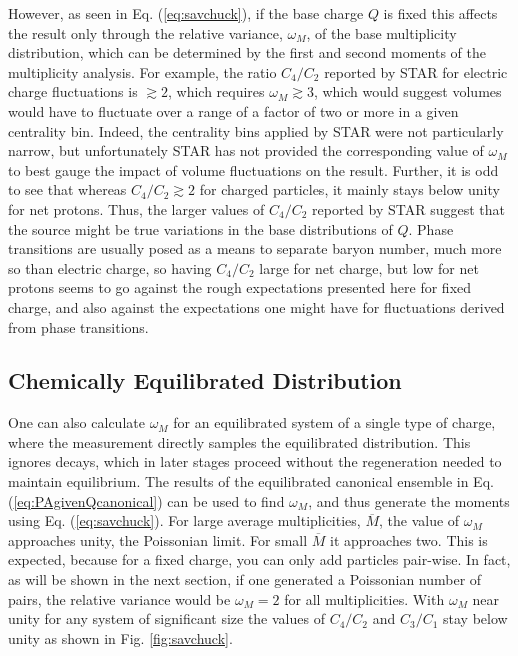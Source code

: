 \documentclass[aps,prc,nofootinbib,showpacs,superscriptaddress,groupedaddress]{revtex4-1}
\begin{document}
However, as seen in Eq. (\ref{eq:savchuck}), if the base charge $Q$ is fixed this affects the result only through the relative variance, $\omega_M$, of the base multiplicity distribution, which can be determined by the first and second moments of the  multiplicity analysis. For example, the ratio $C_4/C_2$ reported by STAR for electric charge fluctuations is $\gtrsim 2$, which requires $\omega_M\gtrsim 3$, which would suggest volumes would have to fluctuate over a range of a factor of two or more in a given centrality bin. Indeed, the centrality bins applied by STAR were not particularly narrow, but unfortunately STAR has not provided the corresponding value of $\omega_M$ to best gauge the impact of volume fluctuations on the result. Further, it is odd to see that whereas $C_4/C_2\gtrsim 2$ for charged particles, it mainly stays below unity for net protons. Thus, the larger values of $C_4/C_2$ reported by STAR suggest that the source might be true variations in the base distributions of $Q$. Phase transitions are usually posed as a means to separate baryon number, much more so than electric charge, so having $C_4/C_2$ large for net charge, but low for net protons seems to go against the rough expectations presented here for fixed charge, and also against the expectations one might have for fluctuations derived from phase transitions. 

\subsection{Chemically Equilibrated Distribution}

One can also calculate $\omega_M$ for an equilibrated system of a single type of charge, where the measurement directly samples the equilibrated distribution. This ignores decays, which in later stages proceed without the regeneration needed to maintain equilibrium. The results of the equilibrated canonical ensemble in Eq. (\ref{eq:PAgivenQcanonical}) can be used to find $\omega_M$, and thus generate the moments using Eq. (\ref{eq:savchuck}). For large average multiplicities, $\overline{M}$, the value of $\omega_M$ approaches unity, the Poissonian limit. For small $\overline{M}$ it approaches two. This is expected, because for a fixed charge, you can only add particles pair-wise. In fact, as will be shown in the next section, if one generated a Poissonian number of pairs, the relative variance would be $\omega_M=2$ for all multiplicities. With $\omega_M$ near unity for any system of significant size the values of $C_4/C_2$ and $C_3/C_1$ stay below unity as shown in Fig. \ref{fig:savchuck}. 
\end{document}
